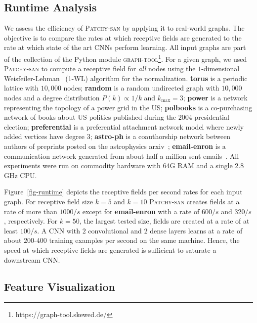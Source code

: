 \documentclass{article}
\begin{document}
\subsection{Runtime Analysis}
We assess the efficiency of \textsc{Patchy-san} by applying it to real-world graphs. The objective is to compare the rates at which receptive fields are generated to the rate at which state of the art CNNs perform learning. All input graphs are part of the collection of the Python module \textsc{graph-tool}\footnote{https://graph-tool.skewed.de/}. For a given graph, we used \textsc{Patchy-san} to compute a receptive field for \emph{all}  nodes using the $1$-dimensional Weisfeiler-Lehman~\cite{douglas2011weisfeiler} (1-WL) algorithm for the normalization.  \textbf{torus} is a periodic lattice with $10,000$ nodes; \textbf{random} is a random undirected graph with $10,000$ nodes and a degree distribution $P(k)  \propto 1/k$ and $k_{\max} = 3$; \textbf{power} is a network representing the topology of a power grid in the US; \textbf{polbooks} is a co-purchasing network of books about US politics published during the $2004$ presidential election; \textbf{preferential} is a preferential attachment network model where newly added vertices have degree $3$; \textbf{astro-ph} is a coauthorship network between authors of preprints posted on the astrophysics arxiv~\cite{newman:2001}; \textbf{email-enron} is a communication network generated from about half a million sent emails~\cite{leskovec:2009}. All experiments were run on commodity hardware with 64G RAM and a single 2.8 GHz CPU. 

Figure~\ref{fig-runtime} depicts the receptive fields per second rates for each input graph. For receptive field size $k=5$ and $k=10$ \textsc{Patchy-san} creates fields at a rate of more than $1000/s$ except for \textbf{email-enron} with a rate of $600/s$ and $320/s$, respectively. For $k=50$, the largest tested size, fields are created at a rate of at least $100/s$. A CNN with $2$ convolutional and $2$ dense layers learns at a rate of about $200$-$400$ training examples per second on the same machine. Hence, the speed at which receptive fields are generated is sufficient to saturate a downstream CNN. 


\subsection{Feature Visualization}
\end{document}
